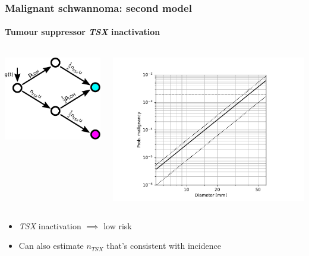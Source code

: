 \documentclass{beamer}
\begin{document}
\begin{frame}
    \frametitle{Malignant schwannoma: second model}
    \framesubtitle{Tumour suppressor \emph{TSX} inactivation}
    \begin{columns}
        \begin{column}{0.45\textwidth}
        \includegraphics[width=\textwidth]{figures/malignancy.pdf}
        \end{column}
        \begin{column}{0.55\textwidth}
        \includegraphics[width=\textwidth]{figures/DiameterTS-oct21}
        \end{column}
    \end{columns}

\begin{itemize}
    \item \emph{TSX} inactivation $\implies$ low risk
    \item Can also estimate $n_{TSX}$ that's consistent with incidence
\end{itemize}
\end{frame}
\end{document}
